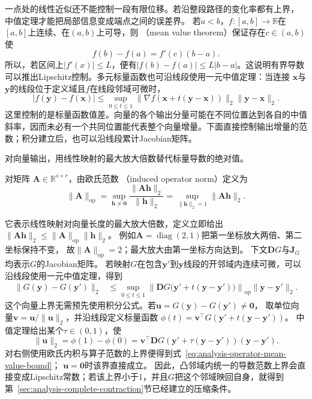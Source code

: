 一点处的线性近似还不能控制一段有限位移。若沿整段路径的变化率都有上界，
中值定理才能把局部信息变成端点之间的误差界。
若$a<b$，$f:[a,b]\to\mathbb{R}$在$[a,b]$上连续、在$(a,b)$上可导，则
（mean value theorem）保证存在$c\in(a,b)$使
\begin{equation}
  f(b)-f(a)=f'(c)(b-a).
\label{eq:analysis-mean-value-theorem}
\end{equation}
所以，若区间上$|f'(x)|\leq L$，便有$|f(b)-f(a)|\leq L|b-a|$。这说明有界导数可以推出Lipschitz控制。多元标量函数也可沿线段使用一元中值定理：当连接 $\bm{x}$与$\bm{y}$的线段位于定义域且$f$在线段邻域可微时，
\[   |f(\bm{y})-f(\bm{x})|   \leq   \sup_{0\leq t\leq1}   \lVert\nabla f(\bm{x}+t(\bm{y}-\bm{x}))\rVert_2   \lVert\bm{y}-\bm{x}\rVert_2. \]
这里控制的是标量函数值差。向量的各个输出分量可能在不同位置达到各自的中值斜率，因而未必有一个共同位置能代表整个向量增量。下面直接控制输出增量的范数；积分建立后，也可以沿线段累计Jacobian矩阵。

对向量输出，用线性映射的最大放大倍数替代标量导数的绝对值。
\begin{definition}[欧氏诱导算子范数]
\label{def:analysis-induced-operator-norm}
对矩阵
$\bm{A}\in\mathbb{R}^{s\times r}$，由欧氏范数
（induced operator norm）定义为
\[
  \lVert\bm{A}\rVert_{\mathrm{op}}
  =
  \sup_{\bm{h}\neq\bm{0}}
  \frac{\lVert\bm{A}\bm{h}\rVert_2}{\lVert\bm{h}\rVert_2}
  =
  \sup_{\lVert\bm{h}\rVert_2=1}\lVert\bm{A}\bm{h}\rVert_2.
\]
\end{definition}
它表示线性映射对向量长度的最大放大倍数，定义立即给出
$\lVert\bm{A}\bm{h}\rVert_2
\leq\lVert\bm{A}\rVert_{\mathrm{op}}\lVert\bm{h}\rVert_2$。
例如$\bm A=\operatorname{diag}(2,1)$把第一坐标放大两倍、第二坐标保持不变，
故$\lVert\bm A\rVert_{\mathrm{op}}=2$；最大放大由第一坐标方向达到。
下文$\bm DG$与$\bm J_G$均表示$G$的Jacobian矩阵。
若映射$G$在包含$\bm{y}'$到$\bm{y}$线段的开邻域内连续可微，可以沿线段使用一元中值定理，得到
\begin{equation}
  \begin{aligned}
  \lVert G(\bm{y})-G(\bm{y}')\rVert_2
  &\leq
  \sup_{0\leq t\leq1}
  \left\lVert
    \bm{D}G\bigl(\bm{y}'+t(\bm{y}-\bm{y}')\bigr)
  \right\rVert_{\mathrm{op}}
  \lVert\bm{y}-\bm{y}'\rVert_2.
  \end{aligned}
\label{eq:analysis-operator-mean-value-bound}
\end{equation}
这个向量上界无需预先使用积分公式。若$\bm u=G(\bm y)-G(\bm y')\neq\bm0$，
取单位向量$\bm v=\bm u/\lVert\bm u\rVert_2$，并沿线段定义标量函数
$\phi(t)=\bm v^\top G(\bm y'+t(\bm y-\bm y'))$。
中值定理给出某个$\tau\in(0,1)$，使
\[
 \lVert\bm u\rVert_2
 =\phi(1)-\phi(0)
 =\bm v^\top\bm DG(\bm y'+\tau(\bm y-\bm y'))(\bm y-\bm y').
\]
对右侧使用欧氏内积与算子范数的上界便得到式~\eqref{eq:analysis-operator-mean-value-bound}；
$\bm u=\bm0$时该界直接成立。
因此，凸邻域内统一的导数范数上界会直接变成Lipschitz常数；若该上界小于$1$，并且$G$把这个邻域映回自身，就得到
第~\ref{sec:analysis-complete-contraction}节已经建立的压缩条件。

